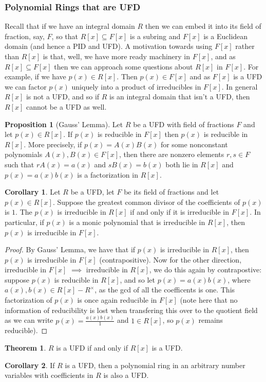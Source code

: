 \documentclass[9pt,reqno]{amsart}
\theoremstyle{definition}
\newtheorem{theorem}{Theorem}[section]
\newtheorem{prop}{Proposition}[section]
\newtheorem{coro}{Corollary}[section]
\begin{document}
\subsubsection{Polynomial Rings that are UFD} Recall that if we have an integral domain $R$ then we can embed it into its field of fraction, say, $F$, so that $R[x] \subseteq F[x]$ is a subring and $F[x]$ is a Euclidean domain (and hence a PID and UFD). A motivation towards using $F[x]$ rather than $R[x]$ is that, well, we have more ready machinery in $F[x]$, and as $R[x] \subseteq F[x]$ then we can approach some questions about $R[x]$ in $F[x]$. For example, if we have $p(x) \in R[x]$. Then $p(x) \in F[x]$ and as $F[x]$ is a UFD we can factor $p(x)$ uniquely into a product of irreducibles in $F[x]$. In general $R[x]$ is not a UFD, and so if $R$ is an integral domain that isn't a UFD, then $R[x]$ cannot be a UFD as well. 



\begin{prop}[Gauss' Lemma] Let $R$ be a UFD with field of fractions $F$ and let $p(x) \in R[x]$. If $p(x)$ is reducible in $F[x]$ then $p(x)$ is reducible in $R[x]$. More precisely, if $p(x) = A(x)B(x)$ for some nonconstant polynomials $A(x), B(x) \in F[x]$, then there are nonzero elements $r,s \in F$ such that $r A(x) = a(x)$ and $sB(x) = b(x)$ both lie in $R[x]$ and $p(x) = a(x) b(x)$ is a factorization in $R[x]$. 	
\end{prop}
\begin{coro}
Let $R$ be a UFD, let $F$ be its field of fractions and let $p(x) \in R[x]$. Suppose the greatest common divisor of the coefficients of $p(x)$ is $1$. The $p(x)$ is irreducible in $R[x]$ if and only if it is irreducible in $F[x]$. In particular, if $p(x)$ is a monic polynomial that is irreducible in $R[x]$, then $p(x)$ is irreducible in $F[x]$. 
\end{coro}
\begin{proof}
	By Gauss' Lemma, we have that if $p(x)$ is irreducible in $R[x]$, then $p(x)$ is irreducible in $F[x]$ (contrapositive). Now for the other direction, irreducible in $F[x]$ $\implies$ irreducible in $R[x]$, we do this again by contrapostive: suppose $p(x)$ is reducible in $R[x]$, and so let $p(x) = a(x) b (x)$, where $a(x), b(x) \in R[x]-R^\times $, as the gcd of all the coefficents is one. This factorization of $p(x)$ is once again reducible in $F[x]$ (note here that no information of reducibility is lost when transfering this over to the quotient field as we can write $p(x) = \frac{a(x)b(x)}{1}$ and $1 \in R[x]$, so $p(x)$ remains reducible). 
\end{proof}
\begin{theorem}
	$R$ is a UFD if and only if $R[x]$ is a UFD.
\end{theorem}
\begin{coro}
If $R$ is a UFD, then a polynomial ring in an arbitrary number variables with coefficients in $R$ is also a UFD. 	
\end{coro}
\end{document}
